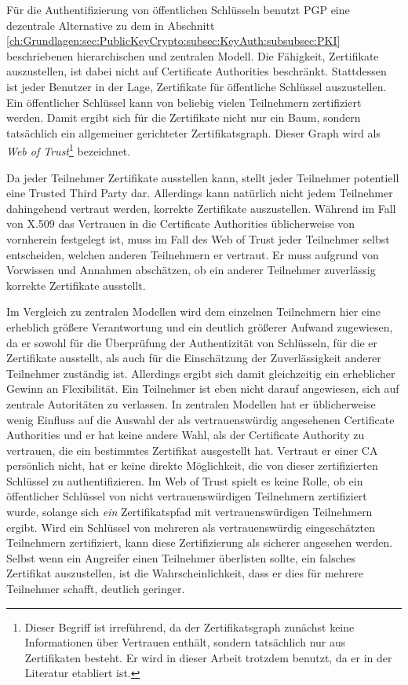 Für die Authentifizierung von öffentlichen Schlüsseln benutzt
PGP eine dezentrale Alternative zu dem in Abschnitt
\ref{ch:Grundlagen:sec:PublicKeyCrypto:subsec:KeyAuth:subsubsec:PKI}
beschriebenen hierarchischen und zentralen
Modell\cite{Ashley1999}. Die Fähigkeit, Zertifikate auszustellen,
ist dabei nicht auf Certificate Authorities beschränkt. Stattdessen
ist jeder Benutzer in der Lage, Zertifikate für öffentliche
Schlüssel auszustellen. Ein öffentlicher Schlüssel kann von
beliebig vielen Teilnehmern zertifiziert werden. Damit ergibt sich
für die Zertifikate nicht nur ein Baum, sondern tatsächlich ein
allgemeiner gerichteter Zertifikatsgraph. Dieser Graph wird als
\emph{Web of Trust}\footnote{Dieser Begriff ist irreführend, da der
  Zertifikatsgraph zunächst keine Informationen über Vertrauen
  enthält, sondern tatsächlich nur aus Zertifikaten besteht. Er
  wird in dieser Arbeit trotzdem benutzt, da er in der Literatur
  etabliert ist.} bezeichnet.

Da jeder Teilnehmer Zertifikate ausstellen kann, stellt jeder
Teilnehmer potentiell eine Trusted Third Party dar. Allerdings kann
natürlich nicht jedem Teilnehmer dahingehend vertraut werden,
korrekte Zertifikate auszustellen. Während im Fall von X.509 das
Vertrauen in die Certificate Authorities üblicherweise von
vornherein festgelegt ist, muss im Fall des Web of Trust jeder
Teilnehmer selbst entscheiden, welchen anderen Teilnehmern er
vertraut. Er muss aufgrund von Vorwissen und Annahmen abschätzen, ob
ein anderer Teilnehmer zuverlässig korrekte Zertifikate
ausstellt. 

Im Vergleich zu zentralen Modellen wird dem einzelnen Teilnehmern hier
eine erheblich größere Verantwortung und ein deutlich größerer
Aufwand zugewiesen, da er sowohl für die Überprüfung der
Authentizität von Schlüsseln, für die er Zertifikate ausstellt,
als auch für die Einschätzung der Zuverlässigkeit anderer
Teilnehmer zuständig ist. Allerdings ergibt sich damit gleichzeitig
ein erheblicher Gewinn an Flexibilität. Ein Teilnehmer ist eben
nicht darauf angewiesen, sich auf zentrale Autoritäten zu
verlassen. In zentralen Modellen hat er üblicherweise wenig Einfluss
auf die Auswahl der als vertrauenswürdig angesehenen Certificate
Authorities und er hat keine andere Wahl, als der Certificate
Authority zu vertrauen, die ein bestimmtes Zertifikat ausgestellt
hat. Vertraut er einer CA persönlich nicht, hat er keine direkte
Möglichkeit, die von dieser zertifizierten Schlüssel zu
authentifizieren. Im Web of Trust spielt es keine Rolle, ob ein
öffentlicher Schlüssel von nicht vertrauenswürdigen Teilnehmern
zertifiziert wurde, solange sich \emph{ein} Zertifikatspfad mit
vertrauenswürdigen Teilnehmern ergibt. Wird ein Schlüssel von
mehreren als vertrauenswürdig eingeschätzten Teilnehmern
zertifiziert, kann diese Zertifizierung als sicherer angesehen
werden. Selbst wenn ein Angreifer einen Teilnehmer überlisten
sollte, ein falsches Zertifikat auszustellen, ist die
Wahrscheinlichkeit, dass er dies für mehrere Teilnehmer schafft,
deutlich geringer.


